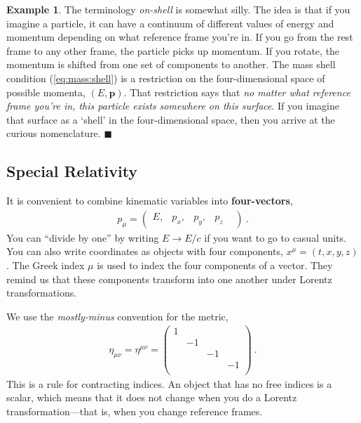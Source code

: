 \documentclass[12pt]{article}
\numberwithin{equation}{section}    %
\renewcommand{\vec}[1]{\mathbf{#1}} %
\theoremstyle{definition}
\newtheorem{eg}[theorem]{Example}
\begin{document}
\begin{eg}
The terminology \emph{on-shell} is somewhat silly. The idea is that if you imagine a particle, it can have a continuum of different values of energy and momentum depending on what reference frame you're in. If you go from the rest frame to any other frame, the particle picks up momentum. If you rotate, the momentum is shifted from one set of components to another. The mass shell condition (\ref{eq:mass:shell}) is a restriction on the four-dimensional space of possible momenta, $(E,\vec p)$. That restriction says that \emph{no matter what reference frame you're in, this particle exists somewhere on this surface}. If you imagine that surface as a `shell' in the four-dimensional space, then you arrive at the curious nomenclature. $\blacksquare$	
\end{eg}


\subsection{Special Relativity}

It is convenient to combine kinematic variables into \textbf{four-vectors},
\begin{align}
	p_\mu = \begin{pmatrix}
		E,&
		p_x,&
		p_y,&
		p_z&
	\end{pmatrix} \ .
\end{align}
You can ``divide by one'' by writing $E\to E/c$ if you want to go to casual units. You can also write coordinates as objects with four components, $x^\mu = (t,x,y,z)$. The Greek index $\mu$ is used to index the four components of a vector. They remind us that these components transform into one another under Lorentz transformations. 

We use the \emph{mostly-minus} convention for the metric,
\begin{align}
	\eta_{\mu\nu} = \eta^{\mu\nu} = \begin{pmatrix}
		 1 &&& \\
		& -1 &&\\
		&& -1 &\\
		&&& -1 \\
	\end{pmatrix} \ .
\end{align}
This is a rule for contracting indices. An object that has no free indices is a scalar, which means that it does not change when you do a Lorentz transformation---that is, when you change reference frames. 
\end{document}
